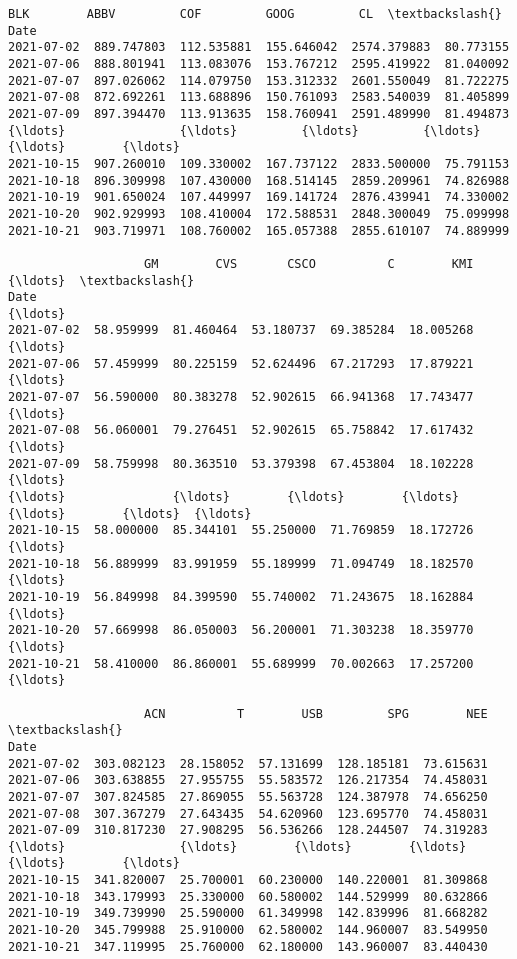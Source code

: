 \documentclass[11pt]{article}
\makeatletter
\newcommand{\boxspacing}{\kern\kvtcb@left@rule\kern\kvtcb@boxsep}
\newcommand{\prompt}[4]{
        {\ttfamily\llap{{\color{#2}[#3]:\hspace{3pt}#4}}\vspace{-\baselineskip}}
    }
\makeatother
\begin{document}
            \begin{tcolorbox}[breakable, size=fbox, boxrule=.5pt, pad at break*=1mm, opacityfill=0]
\prompt{Out}{outcolor}{5}{\boxspacing}
\begin{Verbatim}[commandchars=\\\{\}]
                   BLK        ABBV         COF         GOOG         CL  \textbackslash{}
Date
2021-07-02  889.747803  112.535881  155.646042  2574.379883  80.773155
2021-07-06  888.801941  113.083076  153.767212  2595.419922  81.040092
2021-07-07  897.026062  114.079750  153.312332  2601.550049  81.722275
2021-07-08  872.692261  113.688896  150.761093  2583.540039  81.405899
2021-07-09  897.394470  113.913635  158.760941  2591.489990  81.494873
{\ldots}                {\ldots}         {\ldots}         {\ldots}          {\ldots}        {\ldots}
2021-10-15  907.260010  109.330002  167.737122  2833.500000  75.791153
2021-10-18  896.309998  107.430000  168.514145  2859.209961  74.826988
2021-10-19  901.650024  107.449997  169.141724  2876.439941  74.330002
2021-10-20  902.929993  108.410004  172.588531  2848.300049  75.099998
2021-10-21  903.719971  108.760002  165.057388  2855.610107  74.889999

                   GM        CVS       CSCO          C        KMI  {\ldots}  \textbackslash{}
Date                                                               {\ldots}
2021-07-02  58.959999  81.460464  53.180737  69.385284  18.005268  {\ldots}
2021-07-06  57.459999  80.225159  52.624496  67.217293  17.879221  {\ldots}
2021-07-07  56.590000  80.383278  52.902615  66.941368  17.743477  {\ldots}
2021-07-08  56.060001  79.276451  52.902615  65.758842  17.617432  {\ldots}
2021-07-09  58.759998  80.363510  53.379398  67.453804  18.102228  {\ldots}
{\ldots}               {\ldots}        {\ldots}        {\ldots}        {\ldots}        {\ldots}  {\ldots}
2021-10-15  58.000000  85.344101  55.250000  71.769859  18.172726  {\ldots}
2021-10-18  56.889999  83.991959  55.189999  71.094749  18.182570  {\ldots}
2021-10-19  56.849998  84.399590  55.740002  71.243675  18.162884  {\ldots}
2021-10-20  57.669998  86.050003  56.200001  71.303238  18.359770  {\ldots}
2021-10-21  58.410000  86.860001  55.689999  70.002663  17.257200  {\ldots}

                   ACN          T        USB         SPG        NEE  \textbackslash{}
Date
2021-07-02  303.082123  28.158052  57.131699  128.185181  73.615631
2021-07-06  303.638855  27.955755  55.583572  126.217354  74.458031
2021-07-07  307.824585  27.869055  55.563728  124.387978  74.656250
2021-07-08  307.367279  27.643435  54.620960  123.695770  74.458031
2021-07-09  310.817230  27.908295  56.536266  128.244507  74.319283
{\ldots}                {\ldots}        {\ldots}        {\ldots}         {\ldots}        {\ldots}
2021-10-15  341.820007  25.700001  60.230000  140.220001  81.309868
2021-10-18  343.179993  25.330000  60.580002  144.529999  80.632866
2021-10-19  349.739990  25.590000  61.349998  142.839996  81.668282
2021-10-20  345.799988  25.910000  62.580002  144.960007  83.549950
2021-10-21  347.119995  25.760000  62.180000  143.960007  83.440430


\end{Verbatim}
\end{tcolorbox}
\end{document}
